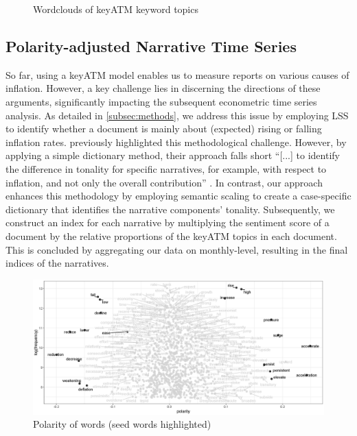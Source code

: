 \begin{figure}
	\caption{Wordclouds of \textsf{keyATM} keyword topics}
	\label{fig:wordclouds}
\end{figure}
\newpage

  
  
 
\subsection{Polarity-adjusted Narrative Time Series}
So far, using a \textsf{keyATM} model enables us to measure reports on various causes of inflation. However, a key challenge lies in discerning the directions of these arguments, significantly impacting the subsequent econometric time series analysis. As detailed in \ref{subsec:methods}, we address this issue by employing \textsf{LSS} to identify whether a document is mainly about (expected) rising or falling inflation rates. \cite{Ellen.2022} previously highlighted this methodological challenge. However, by applying a simple dictionary method, their approach falls short ``[...] to identify the difference in tonality for specific narratives, for example, with respect to inflation, and not only the overall contribution'' \citep[1533]{Ellen.2022}. In contrast, our approach enhances this methodology by employing semantic scaling to create a case-specific dictionary that identifies the narrative components’ tonality. Subsequently, we construct an index for each narrative by multiplying the sentiment score of a document by the relative proportions of the \textsf{keyATM} topics in each document. This is concluded by aggregating our data on monthly-level, resulting in the final indices of the narratives.

\begin{figure}[H]
	\includegraphics[width=1\textwidth]{figures/lss_words.eps}
	\caption{Polarity of words (seed words highlighted)}
	\label{fig:polarity}
\end{figure}

